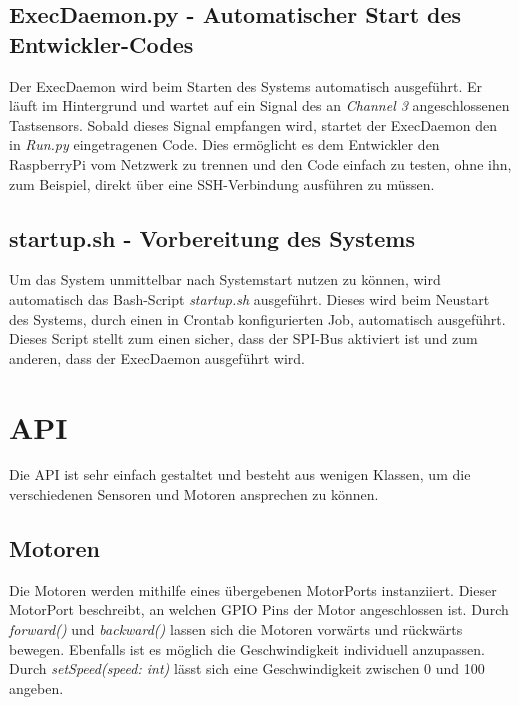 \subsection{ExecDaemon.py - Automatischer Start des Entwickler-Codes}
\label{subsec:execdaemon}

Der ExecDaemon wird beim Starten des Systems automatisch ausgeführt. Er läuft im Hintergrund und wartet auf ein Signal des an \emph{Channel 3} angeschlossenen Tastsensors. Sobald dieses Signal empfangen wird, startet der ExecDaemon den in \emph{Run.py} eingetragenen Code. Dies ermöglicht es dem Entwickler den RaspberryPi vom Netzwerk zu trennen und den Code einfach zu testen, ohne ihn, zum Beispiel, direkt über eine SSH-Verbindung ausführen zu müssen.

\subsection{startup.sh - Vorbereitung des Systems}

Um das System unmittelbar nach Systemstart nutzen zu können, wird automatisch das Bash-Script \emph{startup.sh} ausgeführt. Dieses wird beim Neustart des Systems, durch einen in Crontab konfigurierten Job, automatisch ausgeführt. Dieses Script stellt zum einen sicher, dass der SPI-Bus aktiviert ist und zum anderen, dass der ExecDaemon ausgeführt wird.

\section{API}

Die API ist sehr einfach gestaltet und besteht aus wenigen Klassen, um die verschiedenen Sensoren und Motoren ansprechen zu können. 


\clearpage %

\subsection{Motoren}
Die Motoren werden mithilfe eines übergebenen MotorPorts instanziiert. Dieser MotorPort beschreibt, an welchen GPIO Pins der Motor angeschlossen ist. Durch \emph{forward()} und \emph{backward()} lassen sich die Motoren vorwärts und rückwärts bewegen. Ebenfalls ist es möglich die Geschwindigkeit individuell anzupassen. Durch \emph{setSpeed(speed: int)} lässt sich eine Geschwindigkeit zwischen 0 und 100 angeben. 

